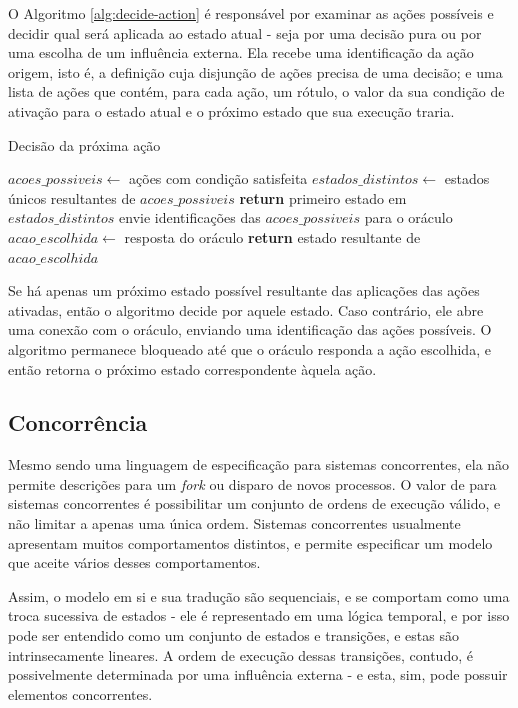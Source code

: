 O Algoritmo \ref{alg:decide-action} é responsável por examinar as ações
possíveis e decidir qual será aplicada ao estado atual - seja por uma decisão
pura ou por uma escolha de um influência externa. Ela recebe uma identificação
da ação origem, isto é, a definição cuja disjunção de ações precisa de uma
decisão; e uma lista de ações que contém, para cada ação, um rótulo, o valor da
sua condição de ativação para o estado atual e o próximo estado que sua execução traria.

\begin{algorithm}
\caption{Decisão da próxima ação}\label{alg:decide-action}
\begin{algorithmic}[1]
\State $acoes\_possiveis\gets$ ações com condição satisfeita
\State $estados\_distintos\gets$ estados únicos resultantes de $acoes\_possiveis$
\State \textbf{return} primeiro estado em $estados\_distintos$
\Else{}
\State envie identificações das $acoes\_possiveis$ para o oráculo
\State $acao\_escolhida\gets$ resposta do oráculo
\State \textbf{return} estado resultante de $acao\_escolhida$
\EndIf
\EndProcedure
\end{algorithmic}
\end{algorithm}

Se há apenas um próximo estado possível resultante das aplicações das ações
ativadas, então o algoritmo decide por aquele estado. Caso contrário, ele abre
uma conexão com o oráculo, enviando uma identificação das ações
possíveis. O algoritmo permanece bloqueado até que o oráculo responda a ação
escolhida, e então retorna o próximo estado correspondente àquela ação.


\subsection{Concorrência}

Mesmo \TLA sendo uma linguagem de especificação para sistemas concorrentes, ela
não permite descrições para um \textit{fork} ou disparo de novos
processos. O valor de \TLA para sistemas concorrentes é possibilitar um conjunto
de ordens de execução válido, e não limitar a apenas uma única ordem. Sistemas
concorrentes usualmente apresentam muitos comportamentos distintos, e \TLA
permite especificar um modelo que aceite vários desses comportamentos.

Assim, o modelo em si e sua tradução são sequenciais, e se comportam como uma troca
sucessiva de estados - ele é representado em uma lógica temporal, e por isso
pode ser entendido como um conjunto de estados e transições, e estas são
intrinsecamente lineares. A ordem de execução dessas transições, contudo, é
possivelmente determinada por uma influência externa - e esta, sim, pode possuir
elementos concorrentes.

